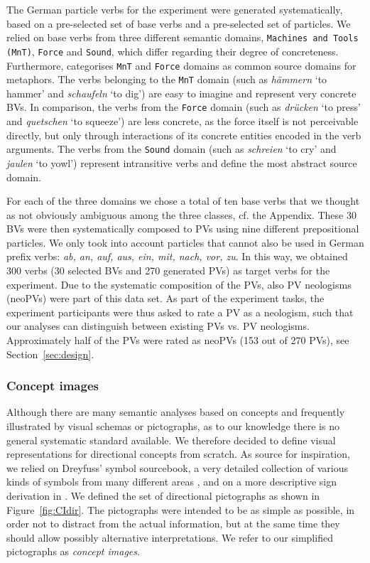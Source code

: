 \documentclass[output=paper]{langsci/langscibook}
\begin{document}
The German particle verbs for the experiment were generated
systematically, based on a pre-selected set of base verbs and a
pre-selected set of particles. We relied on base verbs from three
different semantic domains, \texttt{Machines and Tools (MnT)},
\texttt{Force} and \texttt{Sound}, which differ regarding their degree
of concreteness. Furthermore, \cite{Koevecses:02} categorises
\texttt{MnT} and \texttt{Force} domains as common source domains for
metaphors. The verbs belonging to the \texttt{MnT} domain (such as
\textit{hämmern} `to hammer' and \textit{schaufeln} `to dig') are
easy to imagine and represent very concrete BVs. In comparison, the
verbs from the \texttt{Force} domain (such as \textit{drücken} `to
press' and \textit{quetschen} `to squeeze') are less concrete, as
the force itself is not perceivable directly, but only through
interactions of its concrete entities encoded in the verb
arguments. The verbs from the \texttt{Sound} domain (such as
\textit{schreien} `to cry' and \textit{jaulen} `to yowl')
represent intransitive verbs and define the most abstract source
domain.

For each of the three domains we chose a total of ten base verbs that
we thought as not obviously ambiguous among the three classes, cf. the
Appendix. These 30 BVs were then systematically composed to PVs using
nine different prepositional particles. We only took into account
particles that cannot also be used in German prefix verbs: \textit{ab,
  an, auf, aus, ein, mit, nach, vor, zu}. In this way, we obtained 300
verbs (30 selected BVs and 270 generated PVs) as target verbs for the
experiment. Due to the systematic composition of the PVs, also PV
neologisms (neoPVs) were part of this data set. As part of the
experiment tasks, the experiment participants were thus asked to rate
a PV as a neologism, such that our analyses can distinguish between
existing PVs vs. PV neologisms. Approximately half of the PVs were
rated as neoPVs (153 out of 270 PVs), see Section~\ref{sec:design}.


\subsubsection{Concept images}
\label{sec:image-schema}

Although there are many semantic analyses based on concepts and
frequently illustrated by visual schemas or pictographs, as to our
knowledge there is no general systematic standard available. We
therefore decided to define visual representations for directional
concepts from scratch. As source for inspiration, we relied on
Dreyfuss' symbol sourcebook, a very detailed collection of various
kinds of symbols from many different areas \citep{Dreyfuss:84}, and on
a more descriptive sign derivation in \cite{Frutiger:87}. We defined
the set of directional pictographs as shown in
Figure~\ref{fig:CIdir}. The pictographs were intended to be as simple
as possible, in order not to distract from the actual information, but at the
same time they should allow possibly alternative interpretations. We
refer to our simplified pictographs as \textit{concept images}.
\end{document}
